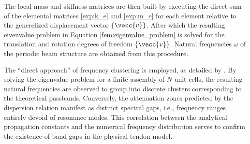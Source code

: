 The local mass and stiffness matrices are then built by executing the direct sum of the elemental matrices \ref{exp:k_e} and \ref{exp:m_e} for each element relative to the generelized displacement vector $\{\vecc{v}\}$. After which the resulting eivenvalue problem in Equation \ref{fem:eigenvalue_problem} is solved for the translation and rotation degrees of freedom $\{\vecc{v}\}$. Natural frequencies $\omega$ of the periodic beam structure are obtained from this procedure.

The ``direct approach'' of frequency clustering is employed, as detailed by \textcite{Domagalski2021}. By solving the eigenvalue problem for a finite assembly of $N$ unit cells, the resulting natural frequencies are observed to group into discrete clusters corresponding to the theoretical passbands. Conversely, the attenuation zones predicted by the dispersion relation manifest as distinct spectral gaps, i.e., frequency ranges entirely devoid of resonance modes. This correlation between the analytical propagation constants and the numerical frequency distribution serves to confirm the existence of band gaps in the physical tendon model.

